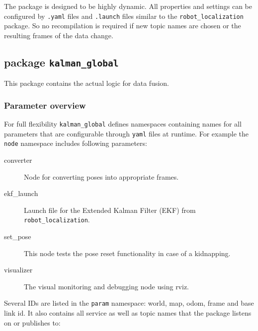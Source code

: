 The package is designed to be highly dynamic. All properties and settings can be configured by \texttt{.yaml} files and \texttt{.launch} files similar to the \texttt{robot\_localization} package. So no recompilation is required if new topic names are chosen or the resulting frames of the data change.

\subsection{package \texttt{kalman\_global}}
This package contains the actual logic for data fusion.

\subsubsection{Parameter overview}
For full flexibility \texttt{kalman\_global} defines namespaces containing names for all parameters that are configurable through \texttt{yaml} files at runtime. For example the \texttt{node} namespace includes following parameters:
\begin{description}
\item[converter] Node for converting poses into appropriate frames.
\item[ekf\_launch] Launch file for the Extended Kalman Filter (EKF) from \texttt{robot\_localization}.
\item[set\_pose] This node tests the pose reset functionality in case of a kidnapping.
\item[visualizer] The visual monitoring and debugging node using rviz.
\end{description}

Several IDs are listed in the \texttt{param} namespace: world, map, odom, frame and base link id. It also contains all service as well as topic names that the package listens on or publishes to:

